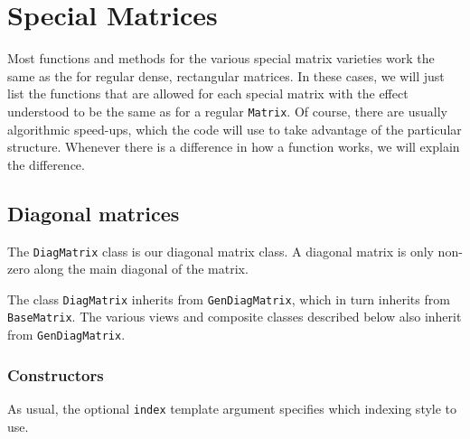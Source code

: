 \documentclass[twoside,letterpaper,11pt]{article}
\renewcommand{\tt}[1]{{\lstinline {#1}}}
\begin{document}
\newpage
\section{Special Matrices}

Most functions and methods for the various special matrix varieties work the same
as the for regular dense, rectangular matrices.  
In these cases, we will just list the functions
that are allowed for each special matrix with the
effect understood to be the same as for a regular \tt{Matrix}.  Of course, there are usually 
algorithmic speed-ups, which the code will use to take advantage of the 
particular structure.
Whenever there is a difference in how a function works,
we will explain the difference.

\subsection{Diagonal matrices}

The \tt{DiagMatrix} class is our diagonal matrix class.  
A diagonal matrix is only non-zero
along the main diagonal of the matrix.  

The class \tt{DiagMatrix} inherits from \tt{GenDiagMatrix},
which in turn inherits from \tt{BaseMatrix}.
The various views and composite classes described below
also inherit from \tt{GenDiagMatrix}.

\subsubsection{Constructors}

As usual, the optional \tt{index} template argument specifies which indexing
style to use.
\end{document}
